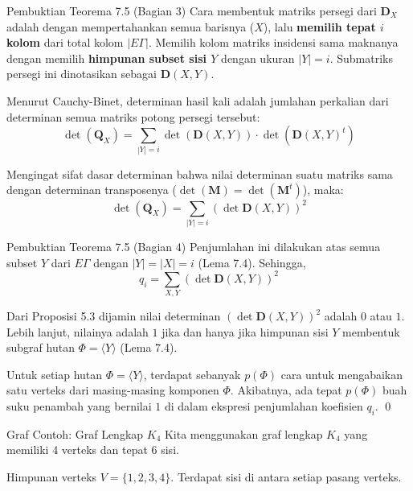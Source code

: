 \documentclass[aspectratio=169]{beamer}
\begin{document}
\begin{frame}{Pembuktian Teorema 7.5 (Bagian 3)}
  Cara membentuk matriks persegi dari $\mathbf{D}_X$ adalah dengan mempertahankan semua barisnya ($X$), lalu \textbf{memilih tepat $i$ kolom} dari total kolom $|E\Gamma|$. Memilih kolom matriks insidensi sama maknanya dengan memilih \textbf{himpunan subset sisi $Y$} dengan ukuran $|Y| = i$. Submatriks persegi ini dinotasikan sebagai $\mathbf{D}(X, Y)$.

  Menurut Cauchy-Binet, determinan hasil kali adalah jumlahan perkalian dari determinan semua matriks potong persegi tersebut:
  $$ \det(\mathbf{Q}_X) = \sum_{|Y|=i} \det(\mathbf{D}(X, Y)) \cdot \det(\mathbf{D}(X, Y)^t) $$

  Mengingat sifat dasar determinan bahwa nilai determinan suatu matriks sama dengan determinan transposenya ($\det(\mathbf{M}) = \det(\mathbf{M}^t)$), maka:
  $$ \det(\mathbf{Q}_X) = \sum_{|Y|=i} (\det \mathbf{D}(X, Y))^2 $$
\end{frame}

\begin{frame}{Pembuktian Teorema 7.5 (Bagian 4)}
  Penjumlahan ini dilakukan atas semua subset $Y$ dari $E\Gamma$ dengan $|Y| = |X| = i$ (Lema 7.4). Sehingga,
  $$ q_i = \sum_{X, Y} (\det \mathbf{D}(X, Y))^2 $$

  Dari Proposisi 5.3 dijamin nilai determinan $(\det \mathbf{D}(X, Y))^2$ adalah $0$ atau $1$. Lebih lanjut, nilainya adalah $1$ jika dan hanya jika himpunan sisi $Y$ membentuk subgraf hutan $\Phi = \langle Y \rangle$ (Lema 7.4).

  Untuk setiap hutan $\Phi = \langle Y \rangle$, terdapat sebanyak $p(\Phi)$ cara untuk mengabaikan satu verteks dari masing-masing komponen $\Phi$. Akibatnya, ada tepat $p(\Phi)$ buah suku penambah yang bernilai $1$ di dalam ekspresi penjumlahan koefisien $q_i$.
  \qed
\end{frame}

\begin{frame}[fragile]{Graf Contoh: Graf Lengkap $K_4$}
  Kita menggunakan graf lengkap $K_4$ yang memiliki 4 verteks dan tepat 6 sisi.

  Himpunan verteks $V = \{1, 2, 3, 4\}$.
  Terdapat sisi di antara setiap pasang verteks.

  \vspace{0.5cm}
  \begin{center}
  \end{center}
\end{frame}
\end{document}
